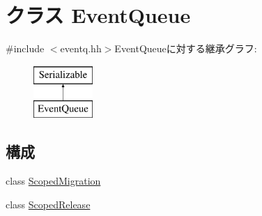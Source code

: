 \hypertarget{classEventQueue}{
\section{クラス EventQueue}
\label{classEventQueue}
}


{\ttfamily \#include $<$eventq.hh$>$}EventQueueに対する継承グラフ:\begin{figure}[H]
\begin{center}
\leavevmode
\includegraphics[height=2cm]{classEventQueue}
\end{center}
\end{figure}
\subsection*{構成}
\begin{DoxyCompactItemize}
\item 
class \hyperlink{classEventQueue_1_1ScopedMigration}{ScopedMigration}
\item 
class \hyperlink{classEventQueue_1_1ScopedRelease}{ScopedRelease}
\end{DoxyCompactItemize}
